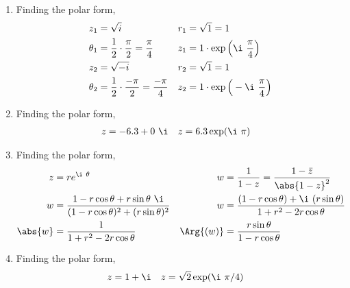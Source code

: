 \begin{enumerate}
    \item Finding the polar form,
          \begin{align}
              z_1      & = \sqrt{i}                                          &
              r_1      & = \sqrt{1} = 1                                        \\
              \theta_1 & = \frac{1}{2} \cdot \frac{\pi}{2} = \frac{\pi}{4}   &
              z_1      & = 1 \cdot \exp\Big( \i\ \frac{\pi}{4} \Big)           \\
              z_2      & = \sqrt{-i}                                         &
              r_2      & = \sqrt{1} = 1                                        \\
              \theta_2 & = \frac{1}{2} \cdot \frac{-\pi}{2} = \frac{-\pi}{4} &
              z_2      & = 1 \cdot \exp\Big( -\i\ \frac{\pi}{4} \Big)
          \end{align}

    \item Finding the polar form,
          \begin{align}
              z & = -6.3 + 0\ \i      &
              z & = 6.3 \exp(\i\ \pi)
          \end{align}

    \item Finding the polar form,
          \begin{align}
              z                  & = re^{\i\ \theta}                                 &
              w                  & = \frac{1}{1-z} = \frac{1-\bar{z}}{\abs{1 - z}^2}   \\
              w                  & = \frac{1 - r\cos\theta + r\sin\theta\ \i}
              {(1 - r\cos\theta)^2
              + (r\sin\theta)^2} &
              w                  & = \frac{(1 - r\cos\theta) + \i\ (r\sin\theta)}
              {1 + r^2
              - 2r\cos\theta}                                                          \\
              \abs{w}            & = \frac{1}{1 + r^2 - 2r\cos\theta}                &
              \Arg{(w)}          & = \frac{r\sin\theta}{1 - r\cos\theta}
          \end{align}

    \item Finding the polar form,
          \begin{align}
              z & = 1 + \i                   &
              z & = \sqrt{2} \exp(\i\ \pi/4)
          \end{align}


\end{enumerate}
